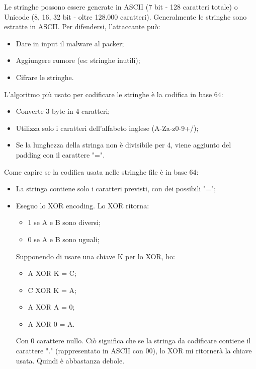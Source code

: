 \documentclass[a4paper]{book}
\begin{document}
Le stringhe possono essere generate in ASCII (7 bit - 128 caratteri totale) o Unicode (8, 16, 32 bit - oltre 128.000 caratteri). Generalmente le stringhe sono estratte in ASCII. 
Per difendersi, l'attaccante può:
\begin{itemize}
    \item Dare in input il malware al packer;
    \item Aggiungere rumore (es: stringhe inutili);
    \item Cifrare le stringhe.
\end{itemize}

L'algoritmo più usato per codificare le stringhe è la codifica in base 64:
\begin{itemize}
    \item Converte 3 byte in 4 caratteri;
    \item Utilizza solo i caratteri dell'alfabeto inglese (A-Za-z0-9+/);
    \item Se la lunghezza della stringa non è divisibile per 4, viene aggiunto del padding con il carattere "=".
\end{itemize}

Come capire se la codifica usata nelle stringhe file è in base 64:
\begin{itemize}
    \item La stringa contiene solo i caratteri previsti, con dei possibili "=";
    \item Eseguo lo XOR encoding. Lo XOR ritorna: 
        \begin{itemize}
            \item 1 se A e B sono diversi;
            \item 0 se A e B sono uguali;
        \end{itemize}
        
        Supponendo di usare una chiave K per lo XOR, ho:
        \begin{itemize}
            \item A XOR K = C;
            \item C XOR K = A;
            \item A XOR A = 0;
            \item A XOR 0 = A.
        \end{itemize}
        
        Con 0 carattere nullo. Ciò significa che se la stringa da codificare contiene il carattere "." (rappresentato in ASCII con 00), lo XOR mi ritornerà la chiave usata. Quindi è abbastanza debole.
\end{itemize}
\end{document}
